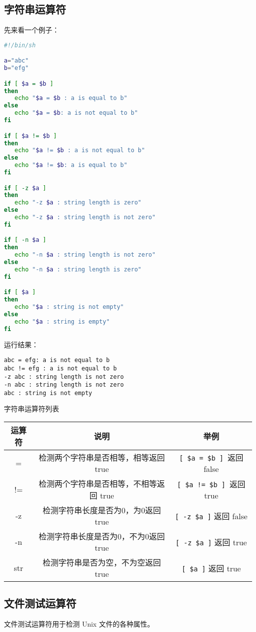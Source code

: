 \subsection{字符串运算符}
先来看一个例子：
\begin{lstlisting}[language=sh]
#!/bin/sh

a="abc"
b="efg"

if [ $a = $b ]
then
   echo "$a = $b : a is equal to b"
else
   echo "$a = $b: a is not equal to b"
fi

if [ $a != $b ]
then
   echo "$a != $b : a is not equal to b"
else
   echo "$a != $b: a is equal to b"
fi

if [ -z $a ]
then
   echo "-z $a : string length is zero"
else
   echo "-z $a : string length is not zero"
fi

if [ -n $a ]
then
   echo "-n $a : string length is not zero"
else
   echo "-n $a : string length is zero"
fi

if [ $a ]
then
   echo "$a : string is not empty"
else
   echo "$a : string is empty"
fi
\end{lstlisting}
运行结果：
\begin{verbatim}
abc = efg: a is not equal to b
abc != efg : a is not equal to b
-z abc : string length is not zero
-n abc : string length is not zero
abc : string is not empty
\end{verbatim}

字符串运算符列表
\begin{center}
\begin{tabular}{c|c|c}
运算符&	说明	&举例\\
\hline
=	&检测两个字符串是否相等，相等返回 true &	\verb|[ $a = $b ] |返回 false\\
!=	&检测两个字符串是否相等，不相等返回 true&	\verb|[ $a != $b ] |返回 true\\
-z	&检测字符串长度是否为0，为0返回 true &     \verb|[ -z $a ]| 返回 false\\
-n	&检测字符串长度是否为0，不为0返回 true&	\verb|[ -z $a ]| 返回 true\\
str	&检测字符串是否为空，不为空返回 true&  	\verb|[ $a ]| 返回 true
\end{tabular}
\end{center}


\subsection{文件测试运算符}
文件测试运算符用于检测 Unix 文件的各种属性。

